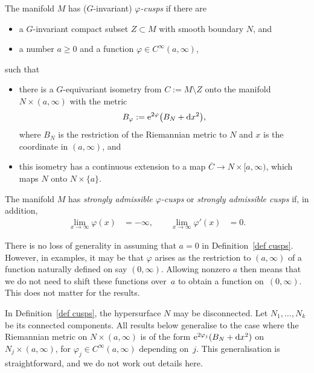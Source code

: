 \documentclass[pdftex]{sigma}%
\numberwithin{equation}{section}
\begin{document}
\begin{Definition}\label{def cusps}
The manifold $M$ has ($G$-invariant) \emph{$\varphi$-cusps} if there are
 \begin{itemize}\itemsep=0pt
 \item a $G$-invariant compact subset $Z \subset M$ with smooth boundary $N$, and
 \item a number $a\geq 0$ and a function $\varphi \in C^{\infty}(a,\infty)$,
 \end{itemize}
 such that
 \begin{itemize}\itemsep=0pt
 \item
 there is a $G$-equivariant isometry from
$C:= {M \setminus Z}$ onto the manifold $N \times (a,\infty)$ with the metric
\begin{equation} \label{eq g phi}
 B_{\varphi} := {\rm e}^{2\varphi}\big(B_N + {\rm d}x^2\big),
\end{equation}
where $B_N$ is the restriction of the Riemannian metric to $N$ and $x$ is the coordinate in $(a,\infty)$, and
\item
this isometry has a continuous extension to a map $\overline{C} \to N \times [a, \infty)$, which maps $N$ onto $N \times \{a\}$.
\end{itemize}
The manifold $M$ has \emph{strongly admissible $\varphi$-cusps} or \emph{strongly admissible cusps} if, in addition,
\begin{equation} \label{eq strong adm}
\begin{aligned}
\lim_{x \to \infty} \varphi(x) &= -\infty,\qquad
\lim_{x \to \infty} \varphi'(x) &= 0.
\end{aligned}
\end{equation}
\end{Definition}

\begin{Remark}%
There is no loss of generality in assuming that $a=0$ in Definition~\ref{def cusps}. However, in examples, it may be that $\varphi$ arises as the restriction to $(a, \infty)$ of a function naturally defined on say $(0, \infty)$. Allowing nonzero $a$ then means that we do not need to shift these functions over~$a$ to obtain a function on~$(0, \infty)$. This does not matter for the results.
\end{Remark}

\begin{Remark}In Definition~\ref{def cusps}, the hypersurface $N$ may be disconnected. Let $N_1, \dots, N_k$ be its connected components. All results below generalise to the case where the Riemannian metric on $N \times (a,\infty)$ is of the form ${\rm e}^{2\varphi_j}(B_N + {\rm d}x^2)$ on $N_j \times (a, \infty)$, for $\varphi_j \in C^{\infty}(a,\infty)$ depending on~$j$. This generalisation is straightforward, and we do not work out details here.
\end{Remark}
\end{document}
